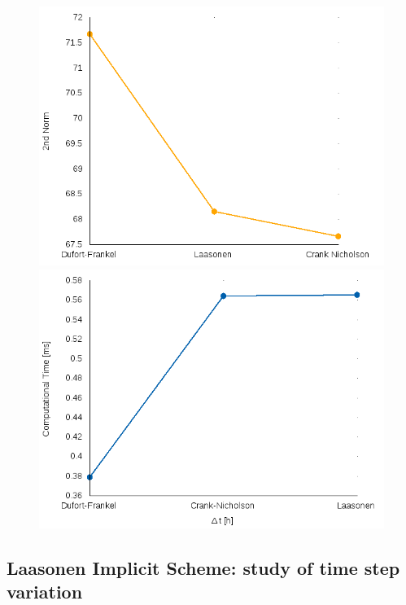 \documentclass[12pt]{article}
\begin{document}
\begin{figure}[!htb]
\centering
\begin{minipage}{.5\textwidth}
  \centering
  \includegraphics[width=.8\linewidth]{norms.png}
\end{minipage}%
\begin{minipage}{.5\textwidth}
  \centering
  \includegraphics[width=.8\linewidth]{default_deltat_times.png}
\end{minipage}
\end{figure}

\subsection*{Laasonen Implicit Scheme: study of time step variation}
\end{document}
